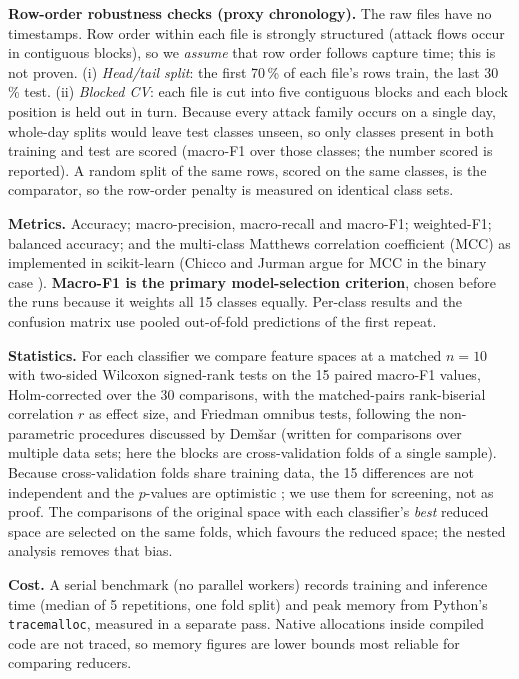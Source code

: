 \documentclass[conference]{IEEEtran}
\begin{document}
\textbf{Row-order robustness checks (proxy chronology).} The raw files have no timestamps. Row order within each file is strongly structured (attack flows occur in contiguous blocks), so we \emph{assume} that row order follows capture time; this is not proven. (i) \emph{Head/tail split}: the first 70\,\% of each file's rows train, the last 30\,\% test. (ii) \emph{Blocked CV}: each file is cut into five contiguous blocks and each block position is held out in turn. Because every attack family occurs on a single day, whole-day splits would leave test classes unseen, so only classes present in both training and test are scored (macro-F1 over those classes; the number scored is reported). A random split of the same rows, scored on the same classes, is the comparator, so the row-order penalty is measured on identical class sets.

\textbf{Metrics.} Accuracy; macro-precision, macro-recall and macro-F1; weighted-F1; balanced accuracy; and the multi-class Matthews correlation coefficient (MCC) as implemented in scikit-learn (Chicco and Jurman argue for MCC in the binary case \cite{chicco2020}). \textbf{Macro-F1 is the primary model-selection criterion}, chosen before the runs because it weights all 15 classes equally. Per-class results and the confusion matrix use pooled out-of-fold predictions of the first repeat.

\textbf{Statistics.} For each classifier we compare feature spaces at a matched $n=10$ with two-sided Wilcoxon signed-rank tests on the 15 paired macro-F1 values, Holm-corrected over the 30 comparisons, with the matched-pairs rank-biserial correlation $r$ as effect size, and Friedman omnibus tests, following the non-parametric procedures discussed by Dem\v{s}ar \cite{demsar2006} (written for comparisons over multiple data sets; here the blocks are cross-validation folds of a single sample). Because cross-validation folds share training data, the 15 differences are not independent and the $p$-values are optimistic \cite{nadeau2003}; we use them for screening, not as proof. The comparisons of the original space with each classifier's \emph{best} reduced space are selected on the same folds, which favours the reduced space; the nested analysis removes that bias.

\textbf{Cost.} A serial benchmark (no parallel workers) records training and inference time (median of 5 repetitions, one fold split) and peak memory from Python's \texttt{tracemalloc}, measured in a separate pass. Native allocations inside compiled code are not traced, so memory figures are lower bounds most reliable for comparing reducers.
\end{document}
